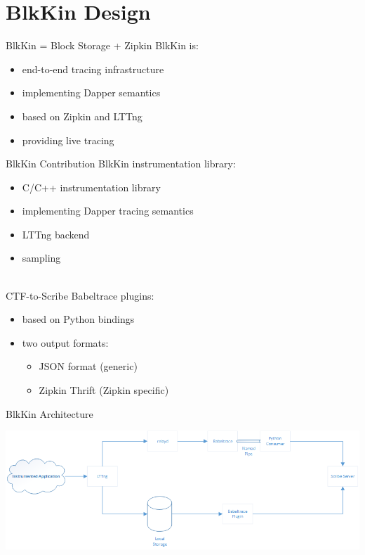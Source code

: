 \section{BlkKin Design}

\begin{frame}{BlkKin = Block Storage + Zipkin}
BlkKin is:
\hfill \\
\begin{itemize}
\item end-to-end tracing infrastructure
\item implementing Dapper semantics
\item based on Zipkin and LTTng 
\item providing live tracing
\end{itemize}
\end{frame}

\begin{frame}{BlkKin Contribution}
BlkKin instrumentation library:
\begin{itemize}
\item C/C++ instrumentation library
\item implementing Dapper tracing semantics
\item LTTng backend
\item sampling
\end{itemize}

\hfill \\
CTF-to-Scribe Babeltrace plugins:
\begin{itemize}
\item based on Python bindings
\item two output formats: 
    \begin{itemize}
    \item JSON format (generic)
    \item Zipkin Thrift (Zipkin specific)
    \end{itemize}
\end{itemize}
\end{frame}

\begin{frame}{BlkKin Architecture}
\begin{center}
\includegraphics[scale=0.52]{images/blkin-internal.png}
\end{center}
\end{frame}

